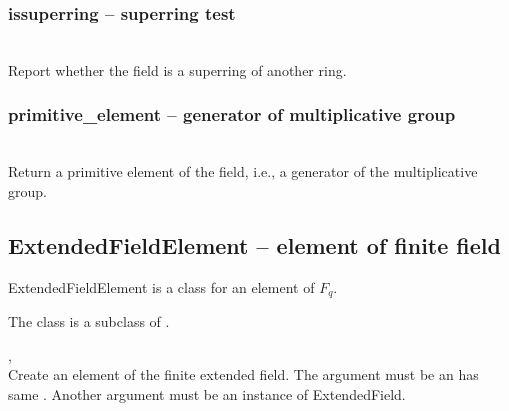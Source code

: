   \subsubsection{issuperring -- superring test}
   \\
   \spacing
   \quad Report whether the field is a superring of another ring.
%
  \subsubsection{primitive\_element -- generator of multiplicative group}
   \\
   \spacing
   \quad Return a primitive element of the field, i.e., a generator of the multiplicative group.
   \spacing
\C
 \subsection{ExtendedFieldElement -- element of finite field}
 ExtendedFieldElement is a class for an element of $F_q$. 

 The class is a subclass of .

  \initialize
       {,\ 
       }
       {}\\
  \spacing
  \quad Create an element of the finite extended field.
  \spacing
  The argument  must be an  has same .
  Another argument \param{field} must be an instance of ExtendedField.

